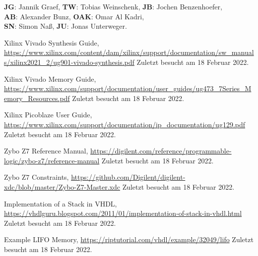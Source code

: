 \documentclass[bibliography=totoc,listof=totoc,index=totoc]{scrartcl}
\begin{document}
    \begin{center}
    \centering
      \textbf{JG}: Jannik Graef, \textbf{TW}: Tobias Weinschenk, \textbf{JB}: Jochen Benzenhoefer, \\
\textbf{AB}: Alexander Bunz, \textbf{OAK}: Omar Al Kadri,\\
\textbf{SN}: Simon Naß, \textbf{JU}: Jonas Unterweger.  
    \end{center}


\newpage
{}
\setcounter{page}{3}


\renewcommand{\refname}{Literaturverzeichnis}
\begin{thebibliography}{9}
Xilinx Vivado Synthesis Guide, \url{https://www.xilinx.com/content/dam/xilinx/support/documentation/sw_manuals/xilinx2021_2/ug901-vivado-synthesis.pdf} Zuletzt besucht am 18 Februar 2022.

Xilinx Vivado Memory Guide, \url{https://www.xilinx.com/support/documentation/user_guides/ug473_7Series_Memory_Resources.pdf} Zuletzt besucht am 18 Februar 2022.

Xilinx Picoblaze User Guide, \url{https://www.xilinx.com/support/documentation/ip_documentation/ug129.pdf} Zuletzt besucht am 18 Februar 2022.

Zybo Z7 Reference Manual, \url{https://digilent.com/reference/programmable-logic/zybo-z7/reference-manual} Zuletzt besucht am 18 Februar 2022.

Zybo Z7 Constraints, \url{https://github.com/Digilent/digilent-xdc/blob/master/Zybo-Z7-Master.xdc} Zuletzt besucht am 18 Februar 2022.

Implementation of a Stack in VHDL, \url{https://vhdlguru.blogspot.com/2011/01/implementation-of-stack-in-vhdl.html} Zuletzt besucht am 18 Februar 2022.

Example LIFO Memory, \url{https://riptutorial.com/vhdl/example/32049/lifo} Zuletzt besucht am 18 Februar 2022.


\end{thebibliography}




\listoffigures
\listoftables
\end{document}
